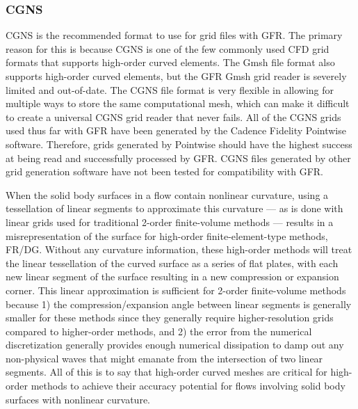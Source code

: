 \subsubsection{CGNS}
\label{SEC:Files:Grid_Input:CGNS}

CGNS is the recommended format to use for grid files with GFR.
%
The primary reason for this is because CGNS is one of the few commonly used CFD
grid formats that supports high-order curved elements.
%
The Gmsh file format also supports high-order curved elements, but the GFR
Gmsh grid reader is severely limited and out-of-date.
%
The CGNS file format is very flexible in allowing for multiple ways to store the
same computational mesh, which can make it difficult to create a universal CGNS grid
reader that never fails.
%
All of the CGNS grids used thus far with GFR have been generated by the Cadence
Fidelity Pointwise software.
%
Therefore, grids generated by Pointwise should have the highest success at
being read and successfully processed by GFR.
%
CGNS files generated by other grid generation software have not been tested
for compatibility with GFR.


When the solid body surfaces in a flow contain nonlinear curvature, using a
tessellation of linear segments to approximate this curvature --- as is done
with linear grids used for traditional 2\supnd-order finite-volume methods ---
results in a misrepresentation of the surface for high-order finite-element-type
methods, \forexample FR\slash DG.
%
Without any curvature information, these high-order methods will treat the
linear tessellation of the curved surface as a series of flat plates, with each
new linear segment of the surface resulting in a new compression or expansion
corner.
%
This linear approximation is sufficient for 2\supnd-order finite-volume methods
because 1) the compression\slash expansion angle between linear segments is
generally smaller for these methods since they generally require
higher-resolution grids compared to higher-order methods, and 2) the error from
the numerical discretization generally provides enough numerical dissipation to
damp out any non-physical waves that might emanate from the intersection of two
linear segments.
%
All of this is to say that high-order curved meshes are critical for high-order
methods to achieve their accuracy potential for flows involving solid body
surfaces with nonlinear curvature.


